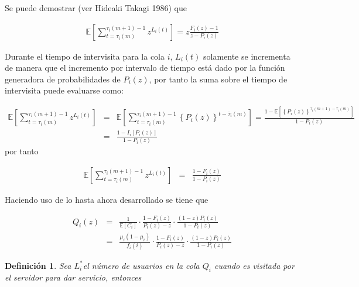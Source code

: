 \documentclass{article}
\newtheorem{Def}{Definición}[section]
\newcommand{\esp}{\mathbb{E}}
\numberwithin{equation}{section}
\begin{document}
{Se puede demostrar (ver Hideaki Takagi 1986) que

\begin{eqnarray*}
\esp\left[\sum_{t=\tau_{i}\left(m\right)}^{\tau_{i}\left(m+1\right)-1}z^{L_{i}\left(t\right)}\right]=z\frac{F_{i}\left(z\right)-1}{z-P_{i}\left(z\right)}
\end{eqnarray*}

Durante el tiempo de intervisita para la cola $i$, $L_{i}\left(t\right)$ solamente se incrementa de manera que el incremento por intervalo de tiempo est\'a dado por la funci\'on generadora de probabilidades de $P_{i}\left(z\right)$, por tanto la suma sobre el tiempo de intervisita puede evaluarse como:

\begin{eqnarray*}
\esp\left[\sum_{t=\tau_{i}\left(m\right)}^{\tau_{i}\left(m+1\right)-1}z^{L_{i}\left(t\right)}\right]&=&\esp\left[\sum_{t=\tau_{i}\left(m\right)}^{\tau_{i}\left(m+1\right)-1}\left\{P_{i}\left(z\right)\right\}^{t-\overline{\tau}_{i}\left(m\right)}\right]=\frac{1-\esp\left[\left\{P_{i}\left(z\right)\right\}^{\tau_{i}\left(m+1\right)-\overline{\tau}_{i}\left(m\right)}\right]}{1-P_{i}\left(z\right)}\\
&=&\frac{1-I_{i}\left[P_{i}\left(z\right)\right]}{1-P_{i}\left(z\right)}
\end{eqnarray*}
por tanto

\begin{eqnarray*}
\esp\left[\sum_{t=\tau_{i}\left(m\right)}^{\tau_{i}\left(m+1\right)-1}z^{L_{i}\left(t\right)}\right]&=&\frac{1-F_{i}\left(z\right)}{1-P_{i}\left(z\right)}
\end{eqnarray*}

Haciendo uso de lo hasta ahora desarrollado se tiene que

\begin{eqnarray*}
Q_{i}\left(z\right)&=&\frac{1}{\esp\left[C_{i}\right]}\cdot\frac{1-F_{i}\left(z\right)}{P_{i}\left(z\right)-z}\cdot\frac{\left(1-z\right)P_{i}\left(z\right)}{1-P_{i}\left(z\right)}\\
&=&\frac{\mu_{i}\left(1-\mu_{i}\right)}{f_{i}\left(i\right)}\cdot\frac{1-F_{i}\left(z\right)}{P_{i}\left(z\right)-z}\cdot\frac{\left(1-z\right)P_{i}\left(z\right)}{1-P_{i}\left(z\right)}
\end{eqnarray*}

\begin{Def}
Sea $L_{i}^{*}$el n\'umero de usuarios en la cola $Q_{i}$ cuando es visitada por el servidor para dar servicio, entonces


\end{Def}}
\end{document}
